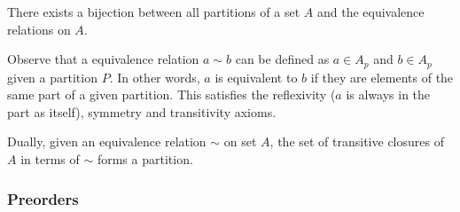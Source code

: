 \documentclass[12pt]{article}
\theoremstyle{definition}
\begin{document}
	There exists a bijection between all partitions of a set $A$ and the equivalence relations on $A$.
	
	Observe that a equivalence relation $a \sim b$ can be defined as $a \in A_p$ and $b \in A_p$ given a partition $P$. In other words, $a$ is equivalent to $b$ if they are elements of the same part of a given partition. This satisfies the reflexivity ($a$ is always in the part as itself), symmetry and transitivity axioms.
	
	Dually, given an equivalence relation $\sim$ on set $A$, the set of transitive closures of $A$ in terms of $\sim$ forms a partition.
	
	\subsubsection{Preorders}
	
	
	
\end{document}
